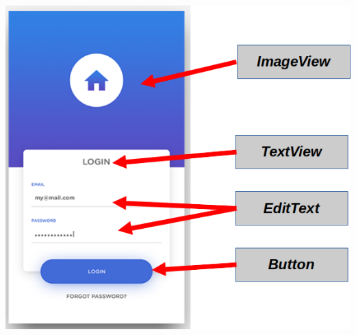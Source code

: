 \begin{frame}
\begin{columns}

\begin{center}
\includegraphics[width=0.95\linewidth]{01_Modificacion/ElementosInterfaz.png}    
\end{center}

\end{columns}

\end{frame}


